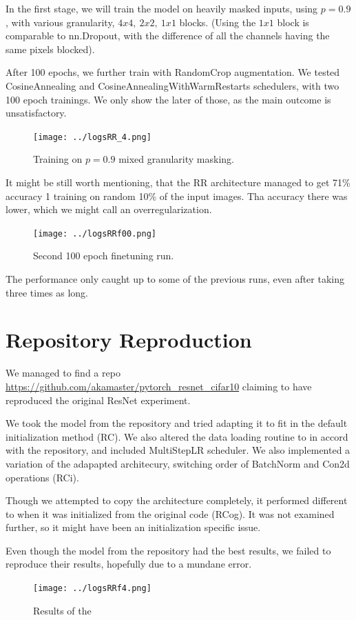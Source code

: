 \documentclass[12pt,a4paper]{article}
\begin{document}
In the first stage, we will train the model on heavily masked
inputs, using $p=0.9$, with various granularity, 
$4x4, \ 2x2, \ 1x1$ blocks. (Using the $1x1$ block is
comparable to nn.Dropout, with the difference of all the
channels having the same pixels blocked).

After 100 epochs, we further train with RandomCrop augmentation.
We tested CosineAnnealing and CosineAnnealingWithWarmRestarts
schedulers, with two 100 epoch trainings. We only show the later
of those, as the main outcome is unsatisfactory.

\begin{figure}[H]
  \texttt{[image: ../logsRR\_4.png]}
  \caption{Training on $p=0.9$ mixed granularity masking.}
\end{figure}

It might be still worth mentioning, that the RR architecture
managed to get 71\% accuracy 1 training on random 10\% of the
input images. Tha accuracy there was lower, which we might call
an overregularization.

\begin{figure}[H]
  \texttt{[image: ../logsRRf00.png]}
  \caption{Second 100 epoch finetuning run.}
\end{figure}

The performance only caught up to some of the previous runs,
even after taking three times as long. 

\section{Repository Reproduction}

We managed to find
a repo \url{https://github.com/akamaster/pytorch_resnet_cifar10}
claiming to have reproduced the original ResNet experiment.

We took the model from the repository and tried adapting it to fit
in the default initialization method (RC). 
We also altered the data loading routine to in accord
with the repository, and included MultiStepLR scheduler.
We also implemented a variation of the adapapted architecury, switching
order of BatchNorm and Con2d operations (RCi).

Though we attempted to copy the architecture completely, it performed
different to when it was initialized from the original code (RCog). It was
not examined further, so it might have been an initialization specific issue.

Even though the model from the repository had the best results, we failed
to reproduce their results, hopefully due to a mundane error.

\begin{figure}[H]
  \texttt{[image: ../logsRRf4.png]}
  \caption{Results of the }
\end{figure}
\end{document}
